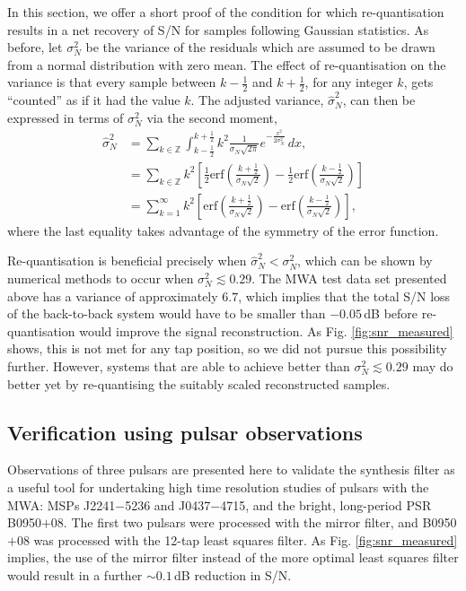 \documentclass{pasa}%
\newcommand{\psrslowB}{B0950$+$08}
\newcommand{\psrkaurJ}{J2241$-$5236}
\newcommand{\psrbhatJ}{J0437$-$4715}
\begin{document}
In this section, we offer a short proof of the condition for which re-quantisation results in a net recovery of S/N for samples following Gaussian statistics.
As before, let $\sigma_N^2$ be the variance of the residuals which are assumed to be drawn from a normal distribution with zero mean.
The effect of re-quantisation on the variance is that every sample between $k-\frac12$ and $k+\frac12$, for any integer $k$, gets ``counted'' as if it had the value $k$.
The adjusted variance, $\hat{\sigma}_N^2$, can then be expressed in terms of $\sigma_N^2$ via the second moment,
\begin{equation}
    \begin{aligned}
        \hat{\sigma}_N^2
         &= \sum_{k \in \mathbb{Z}} \int_{k-\frac12}^{k+\frac12} k^2
            \frac{1}{\sigma_N\sqrt{2\pi}} e^{-\frac{x^2}{2\sigma_N^2}}\,dx, \\
         &= \sum_{k \in \mathbb{Z}} k^2
            \left[\frac12\text{erf}\left(\frac{k+\frac12}{\sigma_N\sqrt{2}}\right) -
            \frac12\text{erf}\left(\frac{k-\frac12}{\sigma_N\sqrt{2}}\right)\right] \\
         &= \sum_{k=1}^{\infty} k^2
            \left[\text{erf}\left(\frac{k+\frac12}{\sigma_N\sqrt{2}}\right) -
            \text{erf}\left(\frac{k-\frac12}{\sigma_N\sqrt{2}}\right)\right],
    \end{aligned}
\end{equation}
where the last equality takes advantage of the symmetry of the error function.

Re-quantisation is beneficial precisely when $\hat{\sigma}_N^2 < \sigma_N^2$, which can be shown by numerical methods to occur when $\sigma_N^2 \lesssim 0.29$.
The MWA test data set presented above has a variance of approximately $6.7$, which implies that the total S/N loss of the back-to-back system would have to be smaller than $-0.05\,$dB before re-quantisation would improve the signal reconstruction.
As Fig. \ref{fig:snr_measured} shows, this is not met for any tap position, so we did not pursue this possibility further.
However, systems that are able to achieve better than $\sigma_N^2 \lesssim 0.29$ may do better yet by re-quantising the suitably scaled reconstructed samples.

\subsection{Verification using pulsar observations}
\label{sec:pulsardata}

Observations of three pulsars are presented here to validate the synthesis filter as a useful tool for undertaking high time resolution studies of pulsars with the MWA: MSPs \psrkaurJ{} and \psrbhatJ{}, and the bright, long-period PSR \psrslowB{}.
The first two pulsars were processed with the mirror filter, and \psrslowB{} was processed with the 12-tap least squares filter.
As Fig. \ref{fig:snr_measured} implies, the use of the mirror filter instead of the more optimal least squares filter would result in a further $\sim 0.1\,$dB reduction in S/N.
\end{document}

